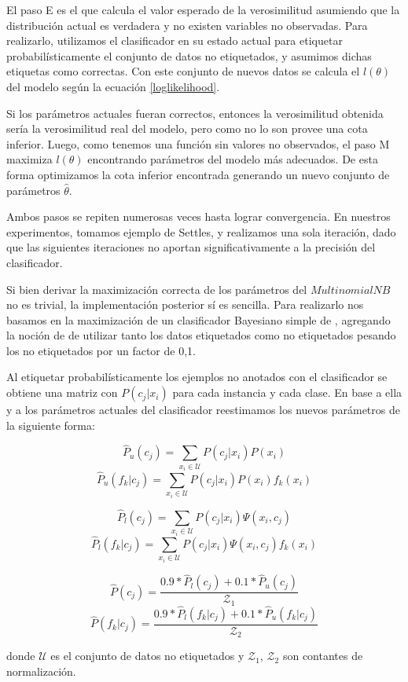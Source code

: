 El paso E es el que calcula el valor esperado de la verosimilitud asumiendo que la distribución actual es verdadera y no existen variables no observadas. Para realizarlo, utilizamos el clasificador en su estado actual para etiquetar probabilísticamente el conjunto de datos no etiquetados, y asumimos dichas etiquetas como correctas. Con este conjunto de nuevos datos se calcula el $l(\theta)$ del modelo según la ecuación \ref{loglikelihood}.

Si los parámetros actuales fueran correctos, entonces la verosimilitud obtenida sería la verosimilitud real del modelo, pero como no lo son provee una cota inferior. Luego, como tenemos una función sin valores no observados, el paso M maximiza $l(\theta)$ encontrando parámetros del modelo más adecuados. De esta forma optimizamos la cota inferior encontrada generando un nuevo conjunto de parámetros $\hat{\theta}$.

Ambos pasos se repiten numerosas veces hasta lograr convergencia. En nuestros experimentos, tomamos ejemplo de Settles, y realizamos una sola iteración, dado  que las siguientes iteraciones no aportan significativamente a la precisión del clasificador.

Si bien derivar la maximización correcta de los parámetros del $MultinomialNB$ no es trivial, la implementación posterior sí es sencilla. Para realizarlo nos basamos en la maximización de un clasificador Bayesiano simple de \citet{data-mining-Liu}, agregando la noción de \citet{dualist} de utilizar tanto los datos etiquetados como no etiquetados pesando los no etiquetados por un factor de 0,1.

Al etiquetar probabilísticamente los ejemplos no anotados con el clasificador se obtiene una matriz con $P(c_j|x_i)$ para cada instancia y cada clase. En base a ella y a los parámetros actuales del clasificador reestimamos los nuevos parámetros de la siguiente forma:

\begin{equation*}
\hat{P}_u(c_j) = \sum_{x_i \in \mathcal{U}} P(c_j|x_i) P(x_i)
\end{equation*}
\begin{equation*}
\hat{P}_u(f_k|c_j) = \sum_{x_i \in \mathcal{U}} P(c_j|x_i) P(x_i) f_k(x_i)
\end{equation*}

\begin{equation*}
\hat{P}_l(c_j) = \sum_{x_i \in \mathcal{U}} P(c_j|x_i) \Psi(x_i, c_j)
\end{equation*}
\begin{equation*}
\hat{P}_l(f_k|c_j) = \sum_{x_i \in \mathcal{U}} P(c_j|x_i) \Psi(x_i, c_j) f_k(x_i)
\end{equation*}

\begin{equation}
\hat{P}(c_j) = \frac{0.9 * \hat{P}_l(c_j) + 0.1 * \hat{P}_u(c_j)}{\mathcal{Z}_1}
\end{equation}
\begin{equation}
\hat{P}(f_k|c_j) = \frac{0.9 * \hat{P}_l(f_k|c_j) + 0.1 * \hat{P}_u(f_k|c_j)}{\mathcal{Z}_2}
\end{equation}

donde $\mathcal{U}$ es el conjunto de datos no etiquetados y $\mathcal{Z}_1$, $\mathcal{Z}_2$ son contantes de normalización.
